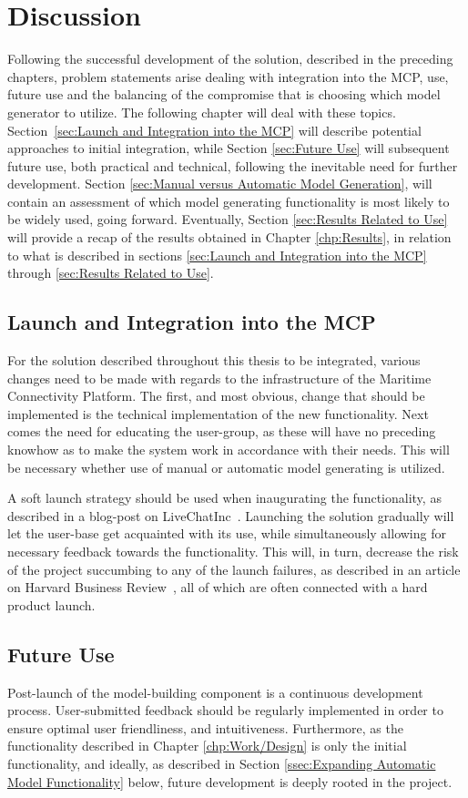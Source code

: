 \chapter{Discussion}
Following the successful development of the solution, described in the preceding chapters, problem statements arise dealing with integration into the MCP, use, future use and the balancing of the compromise that is choosing which model generator to utilize. The following chapter will deal with these topics. Section \ref{sec:Launch and Integration into the MCP} will describe potential approaches to initial integration, while Section \ref{sec:Future Use} will subsequent future use, both practical and technical, following the inevitable need for further development. Section \ref{sec:Manual versus Automatic Model Generation}, will contain an assessment of which model generating functionality is most likely to be widely used, going forward. Eventually, Section \ref{sec:Results Related to Use} will provide a recap of the results obtained in Chapter \ref{chp:Results}, in relation to what is described in sections \ref{sec:Launch and Integration into the MCP} through \ref{sec:Results Related to Use}.

\section{Launch and Integration into the MCP}
For the solution described throughout this thesis to be integrated, various changes need to be made with regards to the infrastructure of the Maritime Connectivity Platform. The first, and most obvious, change that should be implemented is the technical implementation of the new functionality. Next comes the need for educating the user-group, as these will have no preceding knowhow as to make the system work in accordance with their needs. This will be necessary whether use of manual or automatic model generating is utilized.

A soft launch strategy should be used when inaugurating the functionality, as described in a blog-post on LiveChatInc~\cite{hardoSoft}. Launching the solution gradually will let the user-base get acquainted with its use, while simultaneously allowing for necessary feedback towards the functionality. This will, in turn, decrease the risk of the project succumbing to any of the launch failures, as described in an article on Harvard Business Review~\cite{hbr}, all of which are often connected with a hard product launch.
\section{Future Use}
Post-launch of the model-building component is a continuous development process. User-submitted feedback should be regularly implemented in order to ensure optimal user friendliness, and intuitiveness. Furthermore, as the functionality described in Chapter \ref{chp:Work/Design} is only the initial functionality, and ideally, as described in Section \ref{ssec:Expanding Automatic Model Functionality} below, future development is deeply rooted in the project.

